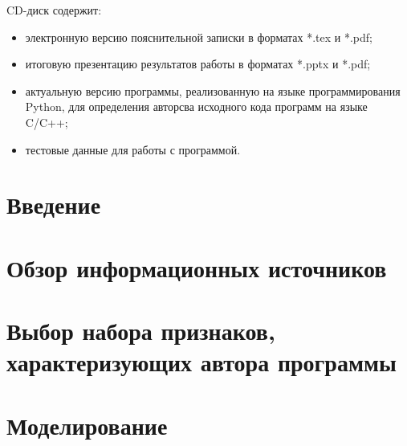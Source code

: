 
 

\newpage
%  
 
 \newpage
%  
 
 
 
 
 \newpage
{}
 \tableofcontents
 CD-диск содержит: 
 \begin{itemize}
 \item электронную версию пояснительной записки в форматах *.tex и *.pdf;
 \item итоговую презентацию результатов работы в форматах *.pptx и *.pdf;
 \item актуальную версию программы, реализованную на языке программирования Python, для определения авторсва исходного кода программ на языке C/C++;
 \item тестовые данные для работы с программой.
 \end{itemize}

 

\newpage
\setcounter{section}{0}
\section*{Введение}


% 


\newpage 
\section{Обзор информационных источников }







\newpage 
\section{Выбор набора признаков, характеризующих автора программы}\label{features}
 
 
\newpage  
\section{Моделирование}\label{modeling}

 
